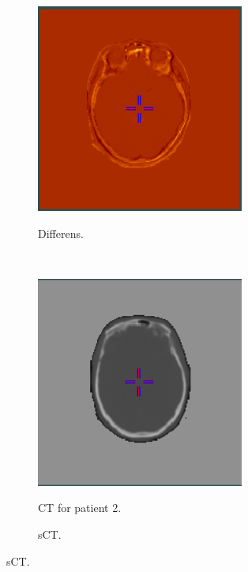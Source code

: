 \begin{figure}
\begin{subfigure}[b]{0.3\textwidth}
        \caption{Differens.}
        \includegraphics[width=0.75\textwidth]{colager/loocv_ct/loocv_010476_sub.png}
        \label{col:loocv_ct_pat1_sub}
    \end{subfigure}\\
    \begin{subfigure}[b]{0.3\textwidth}
        \caption{CT for patient 2.}
        \includegraphics[width=0.75\textwidth]{colager/loocv_ct/loocv_010769_ct.png}
        \label{col:loocv_ct_pat2_ct}
    \end{subfigure}\hfill
    \begin{subfigure}[b]{0.3\textwidth}
        \caption{sCT.}

\end{subfigure}
\end{figure}
